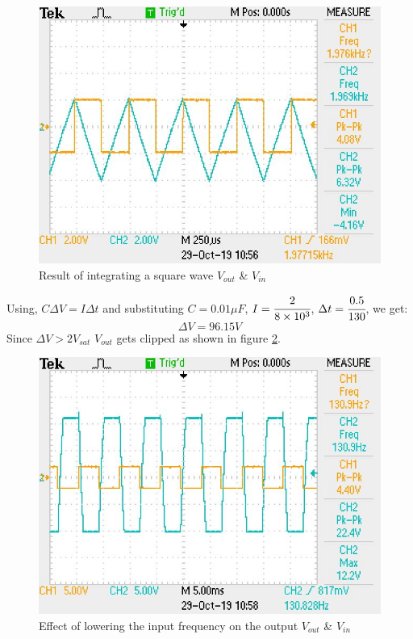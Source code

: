 \documentclass[12pt, titlepage]{article}
\theoremstyle{definition}
\begin{document}
    \begin{figure}[!h]
      \centering
      \includegraphics[scale=0.5]{images/results_q3.jpeg}
      \caption{Result of integrating a square wave \color{cyan}$V_{out}$ \color{black}\& \color{orange}$V_{in}$}
      \label{fig:results_q3}
    \end{figure}

    Using, $ C\Delta V = I\Delta t$ and substituting $C=0.01\mu F$, $I=\cfrac{2}{8\times 10^3}$, $\Delta t = \cfrac{0.5}{130}$, we get:
    $$ \Delta V = 96.15 V$$
    Since $\Delta V > 2V_{sat}$ \text{, } $V_{out}$ gets clipped as shown in figure \ref{fig:results_q4}.

    \begin{figure}[!h]
      \centering
      \includegraphics[scale=0.5]{images/results_q4_2.jpeg}
      \caption{Effect of lowering the input frequency on the output \color{cyan}$V_{out}$ \color{black}\& \color{orange}$V_{in}$}
      \label{fig:results_q4}
    \end{figure}
\end{document}

